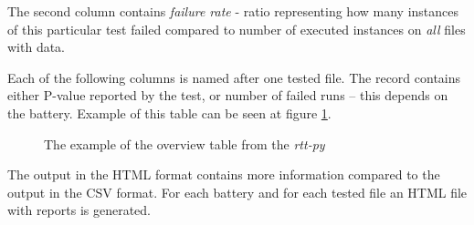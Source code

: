 \documentclass[
  digital,     %
  oneside,     %
  nosansbold,  %
  nocolorbold, %
  nolof,         %
  nolot,         %
]{fithesis4}
\begin{document}
The second column contains \emph{failure rate} - ratio representing how many instances of this particular test failed compared to number of executed instances on \emph{all} files with data.


Each of the following columns is named after one tested file. The record contains either P-value reported by the test, or number of failed runs -- this depends on the battery. Example of this table can be seen at figure \ref{fig:rtt_py_table}.
\begin{figure}
  \begin{center}
  \end{center}
  \caption{The example of the overview table from the \emph{rtt-py}}
  \label{fig:rtt_py_table}
\end{figure}


The output in the HTML format contains more information compared to the output in the CSV format. For each battery and for each tested file an HTML file with reports is generated.
\end{document}
